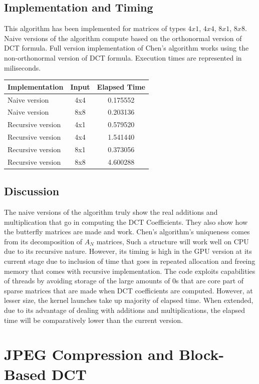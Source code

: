 \documentclass{article}
\begin{document}
\subsection{Implementation and Timing}
This algorithm has been implemented for matrices of types $4x1$, $4x4$, $8x1$, $8x8$. Naive versions of the algorithm compute based on the orthonormal version of DCT formula. Full version implementation of Chen's algorithm works using the non-orthonormal version of DCT formula. Execution times are represented in miliseconds. 
\begin{center}
\begin{tabular}{lcc}
\toprule
Implementation & Input & Elapsed Time \\
\midrule
Naive version & 4x4 & 0.175552 \\
Naive version & 8x8 & 0.203136  \\
Recursive version & 4x1 & 0.579520 \\
Recursive version & 4x4 & 1.541440 \\
Recursive version & 8x1 & 0.373056 \\
Recursive version & 8x8 & 4.600288 \\

\bottomrule
\end{tabular}
\end{center}

\subsection{Discussion}
The naive versions of the algorithm truly show the real additions and multiplication that go in computing the DCT Coefficients. They also show how the butterfly matrices are made and work. Chen's algorithm's uniqueness comes from its decomposition of $A_N$ matrices, Such a structure will work well on CPU due to its recursive nature. However, its timing is high in the GPU version at its current stage due to inclusion of time that goes in repeated allocation and freeing memory that comes with recursive implementation. The code exploits capabilities of threads by avoiding storage of the large amounts of 0s that are core part of sparse matrices that are made when DCT coefficients are computed. However, at lesser size, the kernel launches take up majority of elapsed time. When extended, due to its advantage of dealing with  additions and multiplications, the elapsed time will be comparatively lower than the current version.


\section{JPEG Compression and Block-Based DCT}
\end{document}
